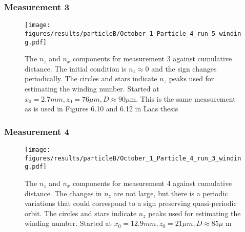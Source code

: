 \subsubsection{Measurement 3}
\begin{figure}[H]
\begin{center}
\texttt{[image: figures/results/particleB/October\_1\_Particle\_4\_run\_5\_winding.pdf]}
\end{center}
\caption{The $n_z$ and $n_x$ components for measurement 3 against cumulative distance. The initial condition is $n_z \approx 0$ and the sign changes periodically. The circles and stars indicate $n_z$ peaks used for estimating the winding number. Started at $x_0 = 2.7 mm, z_0 = 76\mu m, D \approx 90\mu$m. This is the same measurement as is used in Figures 6.10 and 6.12 in Laas thesis~\cite{alexanderThesis}}
\label{fig:particleB3}
\end{figure}


\subsubsection{Measurement 4}
\begin{figure}[H]
\begin{center}
\texttt{[image: figures/results/particleB/October\_1\_Particle\_4\_run\_3\_winding.pdf]}
\end{center}
\caption{The $n_z$ and $n_x$ components for measurement 4 against cumulative distance. The changes in $n_z$ are not large, but there is a periodic variations that could correspond to a sign preserving quasi-periodic orbit.  The circles and stars indicate $n_z$ peaks used for estimating the winding number. Started at $x_0 = 12.9 mm, z_0 = 21\mu m, D \approx 85\mu$ m}
\label{fig:particleB4}
\end{figure}